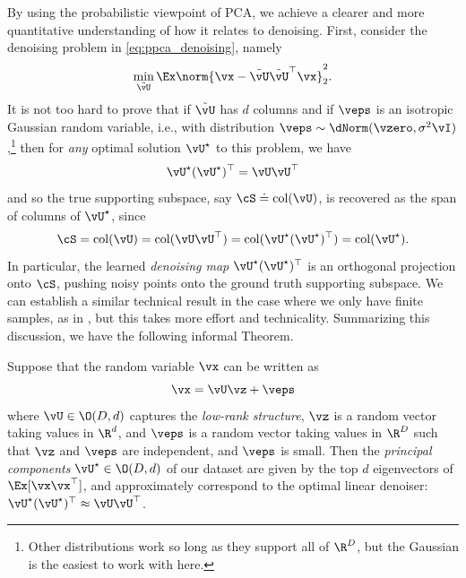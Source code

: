 \documentclass[../../book-main.tex]{subfiles}
\begin{document}
\begin{remark}
    By using the probabilistic viewpoint of PCA, we achieve a clearer
    and more quantitative understanding of how it relates to
    denoising. First, consider the denoising problem in
    \eqref{eq:ppca_denoising}, namely
    \begin{equation}
        \min_{\tilde{\vU}}\Ex\norm{\vx -
        \tilde{\vU}\tilde{\vU}^{\top}\vx}_{2}^{2}.
    \end{equation}
    It is not too hard to prove that if $\tilde{\vU}$ has $d$ columns and if
    \(\veps\) is an isotropic Gaussian
    random variable, i.e., with distribution \(\veps \sim \dNorm(\vzero,
    \sigma^{2}\vI)\),\footnote{Other distributions work so long as they support
    all of \(\R^{D}\), but the Gaussian is the easiest to work with here.} then
    for \textit{any} optimal solution
    \(\vU^{\star}\) to this problem, we have
    \begin{equation}
        \vU^{\star}(\vU^{\star})^{\top} = \vU\vU^{\top}
    \end{equation}
    and so the true supporting subspace, say \(\cS \doteq
    \mathop{\mathrm{col}}(\vU)\), is
    recovered as the span of columns of \(\vU^{\star}\), since
    \begin{equation}
        \cS = \mathop{\mathrm{col}}(\vU) = \mathop{\mathrm{col}}(\vU\vU^{\top})
        = \mathop{\mathrm{col}}(\vU^{\star}(\vU^{\star})^{\top})
        = \mathop{\mathrm{col}}(\vU^{\star}).
    \end{equation}
    In particular, the learned \textit{denoising map}
    \(\vU^{\star}(\vU^{\star})^{\top}\) is an orthogonal projection
    onto \(\cS\), pushing noisy points onto the ground truth
    supporting subspace. We can establish a similar technical result
    in the case where we only have finite samples, as in
    , but this takes more effort and technicality.
    Summarizing this discussion, we have the following informal Theorem.
\end{remark}

\begin{theorem}\label{thm:ppca}
    Suppose that the random variable \(\vx\) can be written as
    \begin{equation}
        \vx = \vU\vz + \veps
    \end{equation}
    where \(\vU \in \O(D, d)\) captures the \textit{low-rank structure}, \(\vz\)
    is a random vector taking values in \(\R^{d}\), and \(\veps\) is a random
    vector taking values in \(\R^{D}\) such that \(\vz\) and \(\veps\) are
    independent, and \(\veps\) is small. Then the \textit{principal components}
    \(\vU^{\star} \in \O(D, d)\) of our dataset are given by the top \(d\)
    eigenvectors of \(\Ex[\vx\vx^{\top}]\), and approximately correspond to the
    optimal linear denoiser: \(\vU^{\star}(\vU^{\star})^{\top}
    \approx \vU\vU^{\top}\).
\end{theorem}
\end{document}
